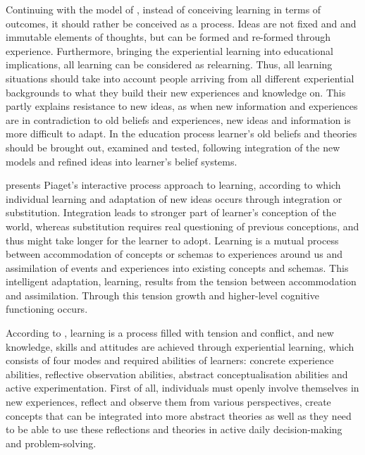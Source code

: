 Continuing with the model of \citet{kolb1984experiential}, instead of conceiving learning in terms of outcomes, it should rather be conceived as a process. Ideas are not fixed and and immutable elements of thoughts, but can be formed and re-formed through experience. Furthermore, bringing the experiential learning into educational implications, all learning can be considered as relearning. Thus, all learning situations should take into account people arriving from all different experiential backgrounds to what they build their new experiences and knowledge on. This partly explains resistance to new ideas, as when new information and experiences are in contradiction to old beliefs and experiences, new ideas and information is more difficult to adapt. In the education process learner's old beliefs and theories should be brought out, examined and tested, following integration of the new models and refined ideas into learner's belief systems. \citep{kolb1984experiential}

\citet{kolb1984experiential} presents Piaget's interactive process approach to learning, according to which individual learning and adaptation of new ideas occurs through integration or substitution. Integration leads to stronger part of learner's conception of the world, whereas substitution requires real questioning of previous conceptions, and thus might take longer for the learner to adopt. Learning is a mutual process between accommodation of concepts or schemas to experiences around us and assimilation of events and experiences into existing concepts and schemas. This intelligent adaptation, learning, results from the tension between accommodation and assimilation. Through this tension growth and higher-level cognitive functioning occurs.\citep{kolb1984experiential}

 According to \citet{kolb1984experiential}, learning is a process filled with tension and conflict, and new knowledge, skills and attitudes are achieved through experiential learning, which consists of four modes and required abilities of learners: concrete experience abilities, reflective observation abilities, abstract conceptualisation abilities and active experimentation. First of all, individuals must openly involve themselves in new experiences, reflect and observe them from various perspectives, create concepts that can be integrated into more abstract theories as well as they need to be able to use these reflections and theories in active daily decision-making and problem-solving.  

